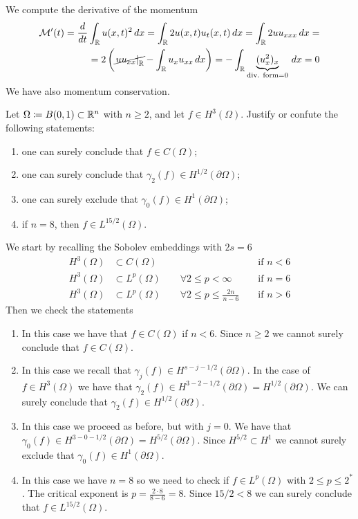 We compute the derivative of the momentum
\[
    \begin{split}
        \mathcal{M}'(t) = \frac{d}{dt} \int_{\mathbb{R}} u(x,t)^2 \, dx = \int_{\mathbb{R}} 2 u(x,t) u_t(x,t) \, dx = \int_{\mathbb{R}} 2 u u_{xxx} \, dx =\\
        = 2\left(\cancel{\left. u u_{xx} \right|_{\mathbb{R}}} - \int_{\mathbb{R}} u_x u_{xx} \, dx\right) = - \int_{\mathbb{R}} \underbrace{(u_x^2)_x}_{\text{div. form} = 0} \, dx = 0
    \end{split}
\]
We have also momentum conservation.

\newpage
\begin{exercise}
    Let \(\Omega \coloneqq B(0, 1) \subset \mathbb{R}^n\) with \(n \geq 2\), and let \(f \in H^3(\Omega)\). Justify or confute the following statements:
    \begin{enumerate}
        \item one can surely conclude that \(f \in C(\Omega)\);
        \item one can surely conclude that \(\gamma_2(f) \in H^{1/2}(\partial\Omega)\);
        \item one can surely exclude that \(\gamma_0(f) \in H^{1}(\partial\Omega)\);
        \item if \(n = 8\), then \(f \in L^{15/2}(\Omega)\).
    \end{enumerate}
\end{exercise}
We start by recalling the Sobolev embeddings with \(2s = 6\)
\begin{align*}
    H^3(\Omega) &\subset C(\Omega) && \text{ if } n < 6 \\
    H^3(\Omega) &\subset L^p(\Omega) \qquad \forall 2 \leq p < \infty && \text{ if } n = 6 \\
    H^3(\Omega) &\subset L^p(\Omega) \qquad \forall 2 \leq p \leq \frac{2n}{n - 6} && \text{ if } n > 6
\end{align*}
Then we check the statements
\begin{enumerate}
    \item In this case we have that \(f \in C(\Omega)\) if \(n < 6\). Since \(n \geq 2\) we cannot surely conclude that \(f \in C(\Omega)\).
    \item In this case we recall that \(\gamma_j(f) \in H^{s - j - 1/2}(\partial\Omega)\). In the case of \(f \in H^3(\Omega)\) we have that \(\gamma_2(f) \in H^{3 - 2 - 1/2}(\partial\Omega) = H^{1/2}(\partial\Omega)\). We can surely conclude that \(\gamma_2(f) \in H^{1/2}(\partial\Omega)\).
    \item In this case we proceed as before, but with \(j = 0\). We have that \(\gamma_0(f) \in H^{3 - 0 - 1/2}(\partial\Omega) = H^{5/2}(\partial\Omega)\). Since \(H^{5/2} \subset H^1\) we cannot surely exclude that \(\gamma_0(f) \in H^{1}(\partial\Omega)\).
    \item In this case we have \(n = 8\) so we need to check if \(f \in L^p(\Omega)\) with \(2\leq p \leq 2^*\). The critical exponent is \(p = \frac{2\cdot 8}{8 - 6} = 8\). Since \(15/2 < 8\) we can surely conclude that \(f \in L^{15/2}(\Omega)\). 
\end{enumerate}

